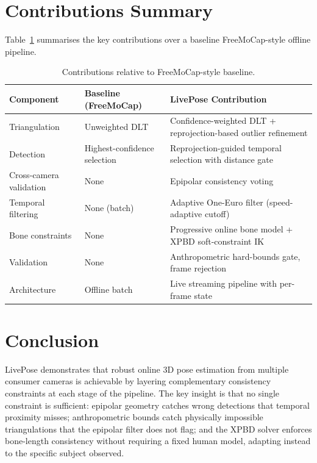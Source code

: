 \documentclass[11pt,a4paper]{article}
\begin{document}
\section{Contributions Summary}

Table~\ref{tab:contributions} summarises the key contributions over a baseline
FreeMoCap-style offline pipeline.

\begin{table}[ht]
\centering
\caption{Contributions relative to FreeMoCap-style baseline.}
\label{tab:contributions}
\renewcommand{\arraystretch}{1.3}
\begin{tabular}{@{}p{4cm}p{4cm}p{5cm}@{}}
\toprule
\textbf{Component} & \textbf{Baseline (FreeMoCap)} & \textbf{LivePose Contribution} \\ \midrule
Triangulation & Unweighted DLT & Confidence-weighted DLT + reprojection-based outlier refinement \\
Detection & Highest-confidence selection & Reprojection-guided temporal selection with distance gate \\
Cross-camera validation & None & Epipolar consistency voting \\
Temporal filtering & None (batch) & Adaptive One-Euro filter (speed-adaptive cutoff) \\
Bone constraints & None & Progressive online bone model + XPBD soft-constraint IK \\
Validation & None & Anthropometric hard-bounds gate, frame rejection \\
Architecture & Offline batch & Live streaming pipeline with per-frame state \\
\bottomrule
\end{tabular}
\end{table}

\section{Conclusion}

LivePose demonstrates that robust online 3D pose estimation from multiple consumer
cameras is achievable by layering complementary consistency constraints at each stage
of the pipeline. The key insight is that no single constraint is sufficient: epipolar
geometry catches wrong detections that temporal proximity misses; anthropometric bounds
catch physically impossible triangulations that the epipolar filter does not flag; and
the XPBD solver enforces bone-length consistency without requiring a fixed human model,
adapting instead to the specific subject observed.
\end{document}

